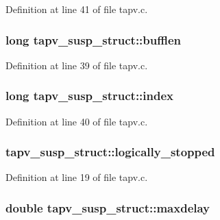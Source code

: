 Definition at line 41 of file tapv.\+c.

\subsubsection[{\texorpdfstring{bufflen}{bufflen}}]{\setlength{\rightskip}{0pt plus 5cm}long tapv\+\_\+susp\+\_\+struct\+::bufflen}\hypertarget{structtapv__susp__struct_a9d447f33cd9cf4ab925fc51f9b7894ec}{}\label{structtapv__susp__struct_a9d447f33cd9cf4ab925fc51f9b7894ec}


Definition at line 39 of file tapv.\+c.

\subsubsection[{\texorpdfstring{index}{index}}]{\setlength{\rightskip}{0pt plus 5cm}long tapv\+\_\+susp\+\_\+struct\+::index}\hypertarget{structtapv__susp__struct_ac3c02cf4fc16c75ba57d2d2582232ce1}{}\label{structtapv__susp__struct_ac3c02cf4fc16c75ba57d2d2582232ce1}


Definition at line 40 of file tapv.\+c.

\subsubsection[{\texorpdfstring{logically\+\_\+stopped}{logically_stopped}}]{ tapv\+\_\+susp\+\_\+struct\+::logically\+\_\+stopped}\hypertarget{structtapv__susp__struct_a17eb8ceaf4db0defd3d466bc0215c8ae}{}\label{structtapv__susp__struct_a17eb8ceaf4db0defd3d466bc0215c8ae}


Definition at line 19 of file tapv.\+c.

\subsubsection[{\texorpdfstring{maxdelay}{maxdelay}}]{\setlength{\rightskip}{0pt plus 5cm}double tapv\+\_\+susp\+\_\+struct\+::maxdelay}\hypertarget{structtapv__susp__struct_aab6d7e00bc522f8b1fb248f32e65866f}{}\label{structtapv__susp__struct_aab6d7e00bc522f8b1fb248f32e65866f}


